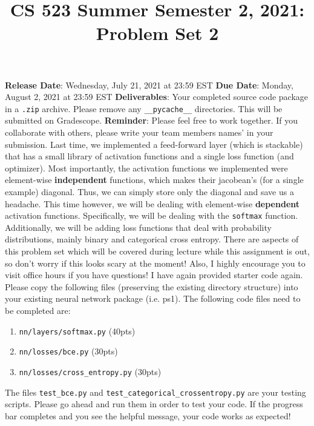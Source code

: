 \documentclass{article}
\title{CS 523 Summer Semester 2, 2021: Problem Set 2}
\begin{document}
\maketitle
\textbf{Release Date}: Wednesday, July 21, 2021 at 23:59 EST\newline
\textbf{Due Date}: Monday, August 2, 2021 at 23:59 EST\newline
\textbf{Deliverables}: Your completed source code package in a \texttt{.zip} archive. Please remove any \texttt{\_\_pycache\_\_} directories. This will be submitted on Gradescope.\newline
\textbf{Reminder}: Please feel free to work together. If you collaborate with others, please write your team members names' in your submission.
\newline
\newline
Last time, we implemented a feed-forward layer (which is stackable) that has a small library of activation functions and a single loss function (and optimizer). Most importantly, the activation functions we implemented were element-wise \textbf{independent} functions, which makes their jacobean's (for a single example) diagonal. Thus, we can simply store only the diagonal and save us a headache.
\newline\newline
This time however, we will be dealing with element-wise \textbf{dependent} activation functions. Specifically, we will be dealing with the \texttt{softmax} function. Additionally, we will be adding loss functions that deal with probability distributions, mainly binary and categorical cross entropy.
\newline
\newline
There are aspects of this problem set which will be covered during lecture while this assignment is out, so don't worry if this looks scary at the moment! Also, I highly encourage you to visit office hours if you have questions!
\newline
\newline
I have again provided starter code again. Please copy the following files (preserving the existing directory structure) into your existing neural network package (i.e. ps1). The following code files need to be completed are:
\begin{enumerate}
    \item \texttt{nn/layers/softmax.py} (40pts)
    \item \texttt{nn/losses/bce.py} (30pts)
    \item \texttt{nn/losses/cross\_entropy.py} (30pts)
\end{enumerate}

The files \texttt{test\_bce.py} and \texttt{test\_categorical\_crossentropy.py} are your testing scripts. Please go ahead and run them in order to test your code. If the progress bar completes and you see the helpful message, your code works as expected!
\end{document}
